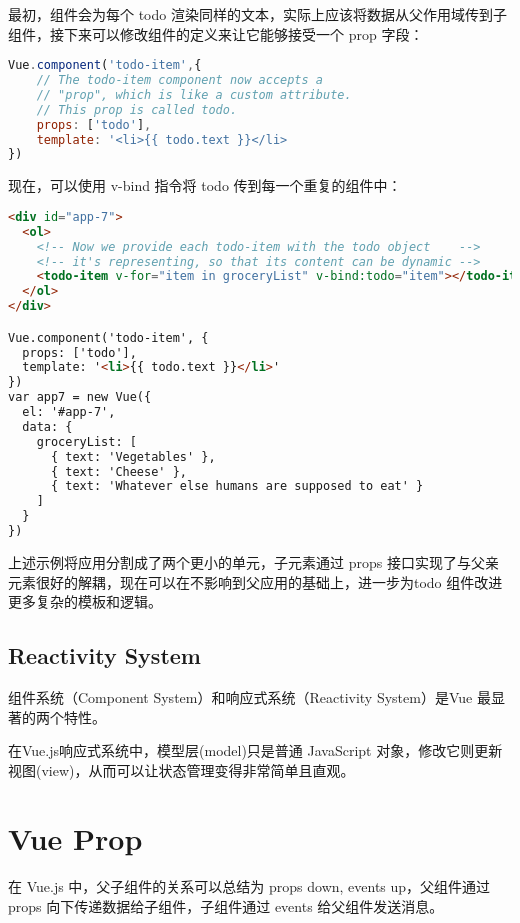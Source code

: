 最初，组件会为每个 todo 渲染同样的文本，实际上应该将数据从父作用域传到子组件，接下来可以修改组件的定义来让它能够接受一个 prop 字段：


\begin{lstlisting}[language=JavaScript]
Vue.component('todo-item',{
    // The todo-item component now accepts a
    // "prop", which is like a custom attribute.
    // This prop is called todo.
    props: ['todo'],
    template: '<li>{{ todo.text }}</li>
})
\end{lstlisting}

现在，可以使用 v-bind 指令将 todo 传到每一个重复的组件中：



\begin{lstlisting}[language=HTML]
<div id="app-7">
  <ol>
    <!-- Now we provide each todo-item with the todo object    -->
    <!-- it's representing, so that its content can be dynamic -->
    <todo-item v-for="item in groceryList" v-bind:todo="item"></todo-item>
  </ol>
</div>

Vue.component('todo-item', {
  props: ['todo'],
  template: '<li>{{ todo.text }}</li>'
})
var app7 = new Vue({
  el: '#app-7',
  data: {
    groceryList: [
      { text: 'Vegetables' },
      { text: 'Cheese' },
      { text: 'Whatever else humans are supposed to eat' }
    ]
  }
})
\end{lstlisting}


上述示例将应用分割成了两个更小的单元，子元素通过 props 接口实现了与父亲元素很好的解耦，现在可以在不影响到父应用的基础上，进一步为todo 组件改进更多复杂的模板和逻辑。


\section{Reactivity System}

组件系统（Component System）和响应式系统（Reactivity System）是Vue 最显著的两个特性。

在Vue.js响应式系统中，模型层(model)只是普通 JavaScript 对象，修改它则更新视图(view)，从而可以让状态管理变得非常简单且直观。



\chapter{Vue Prop}


在 Vue.js 中，父子组件的关系可以总结为 props down, events up，父组件通过 props 向下传递数据给子组件，子组件通过 events 给父组件发送消息。

